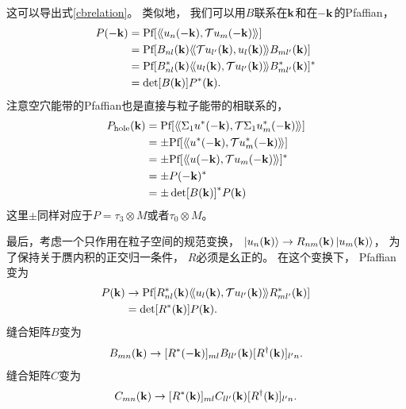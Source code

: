 这可以导出式\eqref{cbrelation}。
类似地，
我们可以用$B$联系在$\vb k$和在$-\vb k$的Pfaffian，
\begin{equation}\label{pfatkmk}
\begin{split}
	P(-\vb k) &= \textnormal{Pf}[\langle\!\langle u_n(-\vb k),\mathcal T u_m(-\vb k) \rangle\!\rangle]\\
	& = \textnormal{Pf}[B_{nl}(\vb k) \langle\!\langle \mathcal T u_{l'}(\vb k),u_{l}(\vb k) \rangle\!\rangle B_{ml'}(\vb k)]\\
	& = \textnormal{Pf}[B^*_{nl}(\vb k)\langle\!\langle u_{l}(\vb k),\mathcal T u_{l'}(\vb k) \rangle\!\rangle B^*_{ml'}(\vb k)]^*\\
	& = \det[B(\vb k)] P^*(\vb k).
\end{split}
\end{equation}
注意空穴能带的Pfaffian也是直接与粒子能带的相联系的，
\begin{equation}\label{holepfaffian}
	\begin{split}
		P_{\textnormal{hole}}(\vb k) &=\textnormal{Pf}[\langle\!\langle \Sigma_1 u^*(-\vb k),\mathcal T \Sigma_1 u_m^*(-\vb k) \rangle\!\rangle]\\
		&=\pm \textnormal{Pf}[\langle\!\langle u^*(-\vb k),\mathcal T u_m^*(-\vb k) \rangle\!\rangle]\\
		&=\pm \textnormal{Pf}[\langle\!\langle u(-\vb k),\mathcal T u_m(-\vb k) \rangle\!\rangle]^*\\
		&=\pm P(-\vb k)^*\\
		&=\pm \det[B(\vb k)]^* P(\vb k)
	\end{split}
\end{equation}
这里$\pm$同样对应于$P=\tau_3\otimes M$或者$\tau_0\otimes M$。

最后，考虑一个只作用在粒子空间的规范变换，
$\ket{u_n(\vb k)} \rightarrow  R_{nm}(\vb k)\ket{u_m(\vb k)}$，
为了保持关于赝内积的正交归一条件，
$R$必须是幺正的。
在这个变换下，
Pfaffian变为
\begin{equation}\label{pdetrp}
\begin{split}
	P(\vb k) &\rightarrow  \textnormal{Pf}[R^*_{nl}(\vb k)\langle\!\langle u_l(\vb k),\mathcal T u_{l'}(\vb k) \rangle\!\rangle R^*_{ml'}(\vb k)]\\
	& = \det[R^*(\vb k)]P(\vb k).
\end{split}
\end{equation}
缝合矩阵$B$变为
\begin{equation}\label{gt4b}
	\begin{split}
		B_{mn}(\vb k)\rightarrow [R^*(-\vb k)]_{ml}B_{ll'}(\vb k)[R^\dagger(\vb k)]_{l'n}.
	\end{split}
\end{equation}
缝合矩阵$C$变为
\begin{equation}
	\begin{split}
		C_{mn}(\vb k)\rightarrow [R^*(\vb k)]_{ml}C_{ll'}(\vb k)[R^\dagger(\vb k)]_{l'n}.
	\end{split}
\end{equation}


